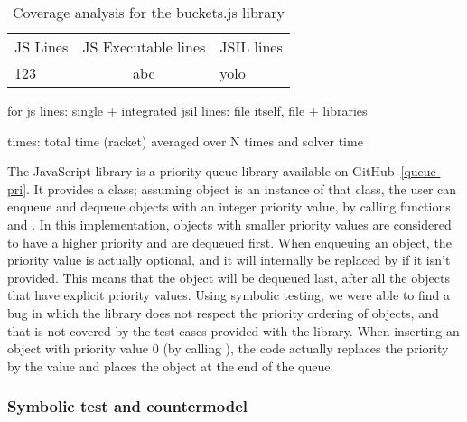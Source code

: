 \begin{table*}[h]
{
\small
\begin{tabular}{lcl}
\toprule
JS Lines & JS Executable lines & JSIL lines \\
\cmidrule{1-1} \cmidrule{3-3}
123 & abc & yolo\\
\bottomrule
\end{tabular}
}
\caption{Coverage analysis for the buckets.js library}
\end{table*}
\FloatBarrier

for js lines: single + integrated
jsil lines: file itself, file + libraries

times: total time (racket) averaged over N times and solver time


The JavaScript  library is a priority queue library available on GitHub~\ref{queue-pri}.
It provides a  class; assuming object  is an instance of that class, the user can enqueue and dequeue objects with an integer priority value, by calling functions  and .
In this implementation, objects with smaller priority values are considered to have a higher priority and are dequeued first.
When enqueuing an object, the priority value is actually optional, and it will internally be replaced by  if it isn't provided.
This means that the object will be dequeued last, after all the objects that have explicit priority values.
Using \cosette symbolic testing, we were able to find a bug in which the library does not respect the priority ordering of objects, and that is not covered by the test cases provided with the library.
When inserting an object with priority value $0$ (by calling ), the code actually replaces the priority by the  value and places the object at the end of the queue.

\subsubsection{Symbolic test and countermodel}

